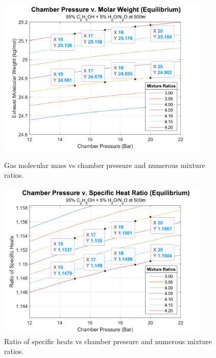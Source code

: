 \documentclass[9pt]{article} %
\numberwithin{equation}{section} %
\begin{document}
\begin{figure}
    \centering
    \begin{minipage}{0.475\textwidth}
        \centering
        \includegraphics[scale=0.5, width=0.9\textwidth]{cp_molar_mix_labeled} %
        \caption{Gas molecular mass vs chamber pressure and numerous mixture ratios.}
        \label{fig:cp_molar}
    \end{minipage}\hfill
    \begin{minipage}{0.475\textwidth}
        \centering
        \includegraphics[scale=0.5, width=0.9\textwidth]{cp_gamma_mix_labeled} %
        \caption{Ratio of specific heats vs chamber pressure and numerous mixture ratios.}
        \label{fig:cp_gamma}
    \end{minipage}
\end{figure}
\end{document}
